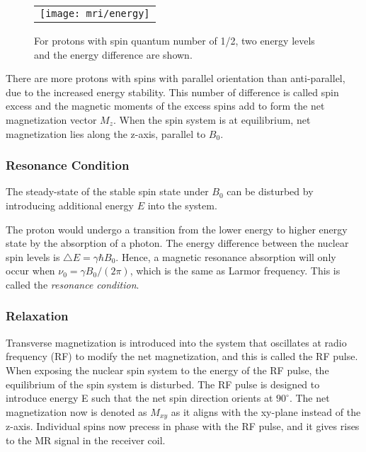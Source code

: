 \begin{figure}[htb]
\begin{center}
\begin{tabular}{c}
\texttt{[image: mri/energy]}
\end{tabular}
\caption{For protons with spin quantum number of 1/2, two energy
levels and the energy difference are shown.} \label{fig:energy}
\end{center}
\end{figure}

There are more protons with spins with parallel orientation than anti-parallel, due to the increased energy stability. This number of difference is called spin excess and the magnetic moments of the excess spins add to form the net magnetization vector $M_z$. When the spin system is at equilibrium, net magnetization lies along the z-axis, parallel to $B_0$.

\subsubsection{Resonance Condition}

The steady-state of the stable spin state under $B_0 $ can be disturbed by introducing additional energy $E$ into the system. 

The proton would undergo a transition from the lower energy to higher energy state by the absorption of a photon. The energy difference between the nuclear spin levels is $\bigtriangleup E = \gamma \hbar B_0$. Hence, a magnetic resonance absorption will only occur when $\nu_0 = \gamma B_0/(2 \pi)$, which is the same as Larmor frequency. This is called the \textit{resonance condition}. 

\subsubsection{Relaxation}
Transverse magnetization is introduced into the system that oscillates at radio frequency (RF) to modify the net magnetization, and this is called the RF pulse. When exposing the nuclear spin system to the energy of the RF pulse, the equilibrium of the spin system is disturbed. The RF pulse is designed to introduce energy E such that the net spin direction orients at $90^\circ$. The net magnetization now is denoted as $M_{xy}$ as it aligns with the xy-plane instead of the z-axis. Individual spins now precess in phase with the RF pulse, and it gives rises to the MR signal in the receiver coil. 

